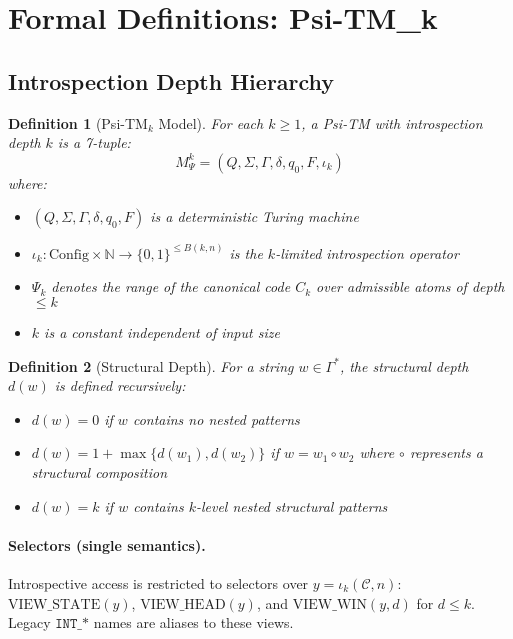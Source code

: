 \documentclass[11pt]{article}
\newtheorem{definition}{Definition}
\begin{document}
\section{Formal Definitions: Psi-TM_k}

\subsection{Introspection Depth Hierarchy}

\begin{definition}[Psi-TM$_k$ Model]
For each $k \geq 1$, a Psi-TM with introspection depth $k$ is a 7-tuple:
$$M_\Psi^k = (Q, \Sigma, \Gamma, \delta, q_0, F, \iota_k)$$
where:
\begin{itemize}
\item $(Q, \Sigma, \Gamma, \delta, q_0, F)$ is a deterministic Turing machine
\item $\iota_k: \mathrm{Config}\times \mathbb{N} \to \{0,1\}^{\le B(k,n)}$ is the $k$-limited introspection operator
\item $\Psi_k$ denotes the range of the canonical code $C_k$ over admissible atoms of depth $\le k$
\item $k$ is a constant independent of input size
\end{itemize}
\end{definition}

\begin{definition}[Structural Depth]
For a string $w \in \Gamma^*$, the structural depth $d(w)$ is defined recursively:
\begin{itemize}
\item $d(w) = 0$ if $w$ contains no nested patterns
\item $d(w) = 1 + \max\{d(w_1), d(w_2)\}$ if $w = w_1 \circ w_2$ where $\circ$ represents a structural composition
\item $d(w) = k$ if $w$ contains $k$-level nested structural patterns
\end{itemize}
\end{definition}

\paragraph{Selectors (single semantics).} Introspective access is restricted to selectors over $y=\iota_k(\mathcal{C},n)$: $\mathrm{VIEW\_STATE}(y)$, $\mathrm{VIEW\_HEAD}(y)$, and $\mathrm{VIEW\_WIN}(y,d)$ for $d\le k$. Legacy $\texttt{INT\_*}$ names are aliases to these views.
\end{document}
